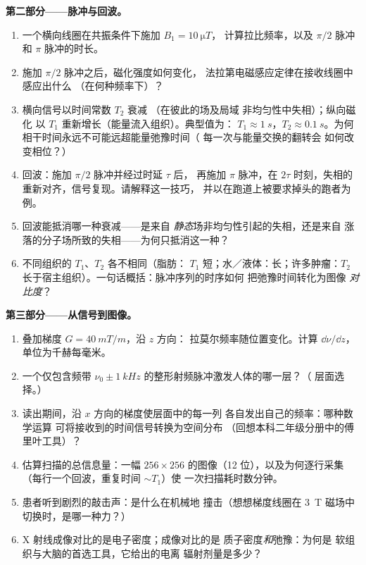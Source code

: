 \begin{problem}
\medskip\noindent\textbf{第二部分——脉冲与回波。}
\begin{enumerate}[resume]
  \item 一个横向线圈在共振条件下施加 $B_1 = \qty{10}{\micro T}$，
        计算拉比频率，以及
        $\pi/2$ 脉冲和 $\pi$ 脉冲的时长。
  \item 施加 $\pi/2$ 脉冲之后，磁化强度如何变化，
        法拉第电磁感应定律在接收线圈中感应出什么
        （在何种频率下）？
  \item 横向信号以时间常数 $T_2$ 衰减
        （在彼此的场及局域
        非均匀性中失相）；纵向磁化
        以 $T_1$ 重新增长（能量流入组织）。典型值为：
        $T_1 \approx \qty{1}{s}$，$T_2 \approx \qty{0.1}{s}$。为何
        相干时间永远不可能远超能量弛豫时间（
        每一次与能量交换的翻转会
        如何改变相位？）
  \item {}回波：施加 $\pi/2$ 脉冲并经过时延 $\tau$ 后，
        再施加 $\pi$ 脉冲，在 $2\tau$ 时刻，失相的
        重新对齐，信号复现。请解释这一技巧，
        并以在跑道上被要求掉头的跑者为例。
  \item 回波能抵消哪一种衰减——是来自
        \emph{静态}场非均匀性引起的失相，还是来自
        涨落的分子场所致的失相——为何只抵消这一种？
  \item 不同组织的 $T_1$、$T_2$ 各不相同（脂肪：
        $T_1$ 短；水／液体：长；许多肿瘤：$T_2$
        长于宿主组织）。一句话概括：脉冲序列的时序如何
        把弛豫时间转化为图像
        \emph{对比度}？
\end{enumerate}

\medskip\noindent\textbf{第三部分——从信号到图像。}
\begin{enumerate}[resume]
  \item 叠加梯度 $G = \qty{40}{mT/m}$，沿 $z$ 方向：
        拉莫尔频率随位置变化。计算
        $\dd\nu/\dd z$，单位为千赫每毫米。
  \item 一个仅包含频带 $\nu_0 \pm
        \qty{1}{kHz}$ 的整形射频脉冲激发人体的哪一层？（
        层面选择。）
  \item 读出期间，沿 $x$ 方向的梯度使层面中的每一列
        各自发出自己的频率：哪种数学运算
        可将接收到的时间信号转换为空间分布
        （回想本科二年级分册中的傅里叶工具）？
  \item 估算扫描的总信息量：一幅 $256 \times 256$
        的图像（12 位），以及为何逐行采集
        （每行一个回波，重复时间 $\sim T_1$）使
        一次扫描耗时数分钟。
  \item 患者听到剧烈的敲击声：是什么在机械地
        撞击（想想梯度线圈在
        \qty{3}{T} 磁场中切换时，是哪一种力？）
  \item X 射线成像对比的是电子密度；成像对比的是
        质子密度\emph{和}弛豫：为何是
        软组织与大脑的首选工具，它给出的电离
        辐射剂量是多少？
\end{enumerate}


\end{problem}
